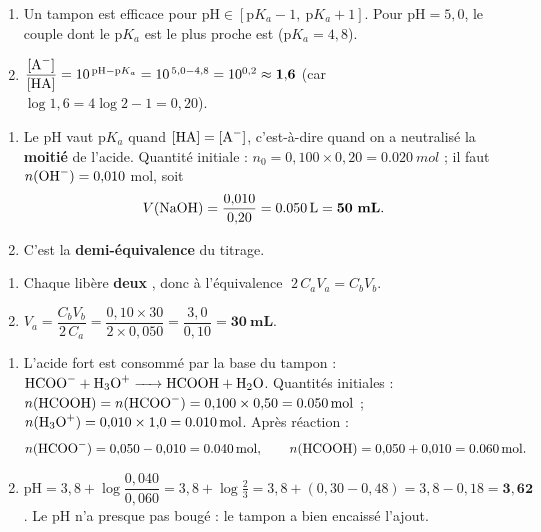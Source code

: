 \documentclass[11pt,a4paper]{article}
\begin{document}

\begin{corrige}
\begin{enumerate}[label=\alph*)]
  \item Un tampon est efficace pour $\mathrm{pH} \in [\mathrm{p}K_a - 1,\ \mathrm{p}K_a + 1]$. Pour
        $\mathrm{pH} = 5{,}0$, le couple dont le $\mathrm{p}K_a$ est le plus proche est
        \textbf{} ($\mathrm{p}K_a = 4{,}8$).
  \item $\dfrac{[\ce{A-}]}{[\ce{HA}]} = 10^{\,\mathrm{pH}-\mathrm{p}K_a} = 10^{\,5{,}0-4{,}8} = 10^{0{,}2}
        \approx \mathbf{1{,}6}$ (car $\log 1{,}6 = 4\log 2 - 1 = 0{,}20$).
\end{enumerate}
\end{corrige}

\begin{corrige}
\begin{enumerate}[label=\alph*)]
  \item Le pH vaut $\mathrm{p}K_a$ quand $[\ce{HA}] = [\ce{A-}]$, c'est-à-dire quand on a neutralisé la
        \textbf{moitié} de l'acide. Quantité initiale : $n_0 = 0{,}100 \times 0{,}20 = \qty{0,020}{mol}$ ; il faut
        $n(\ce{OH-}) = 0{,}010$ mol, soit
        \[ V(\ce{NaOH}) = \frac{0{,}010}{0{,}20} = \qty{0,050}{L} = \mathbf{50\ mL}. \]
  \item C'est la \textbf{demi-équivalence} du titrage.
\end{enumerate}
\end{corrige}

\begin{corrige}
\begin{enumerate}[label=\alph*)]
  \item Chaque  libère \textbf{deux} , donc à l'équivalence $\;2\,C_a V_a = C_b V_b$.
  \item $V_a = \dfrac{C_b V_b}{2\,C_a} = \dfrac{0{,}10 \times 30}{2 \times 0{,}050} = \dfrac{3{,}0}{0{,}10}
        = \mathbf{30\ mL}$.
\end{enumerate}
\end{corrige}

\begin{corrige}
\begin{enumerate}[label=\alph*)]
  \item L'acide fort est consommé par la base du tampon : $\ce{HCOO- + H3O+ -> HCOOH + H2O}$. Quantités
        initiales : $n(\ce{HCOOH}) = n(\ce{HCOO-}) = 0{,}100\times0{,}50 = \qty{0,050}{mol}$ ;
        $n(\ce{H3O+}) = 0{,}010\times1{,}0 = \qty{0,010}{mol}$. Après réaction :
        \[ n(\ce{HCOO-}) = 0{,}050 - 0{,}010 = \qty{0,040}{mol},\qquad n(\ce{HCOOH}) = 0{,}050 + 0{,}010 = \qty{0,060}{mol}. \]
  \item $\mathrm{pH} = 3{,}8 + \log\dfrac{0{,}040}{0{,}060} = 3{,}8 + \log\tfrac{2}{3}
        = 3{,}8 + (0{,}30 - 0{,}48) = 3{,}8 - 0{,}18 = \mathbf{3{,}62}$. Le pH n'a presque pas bougé : le tampon a
        bien encaissé l'ajout.
\end{enumerate}
\end{corrige}
\end{document}
